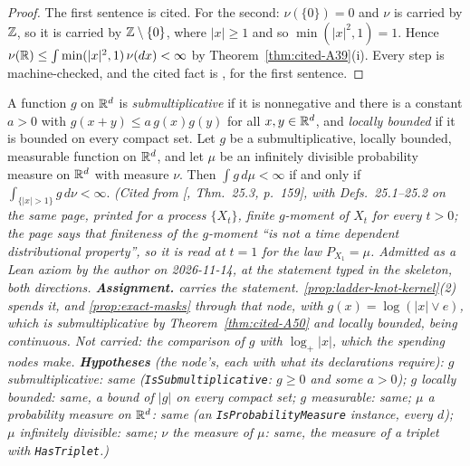 \begin{proof}
\leanok
{}
The first sentence is cited. For the second: $\nu(\{0\}) = 0$ and $\nu$ is carried by $\mathbb{Z}$, so it
is carried by $\mathbb{Z} \setminus \{0\}$, where $|x| \ge 1$ and so $\min(|x|^2, 1) = 1$. Hence
$\nu(\mathbb{R}) \le \int \min(|x|^2, 1)\,\nu(dx) < \infty$ by Theorem~\ref{thm:cited-A39}(i). Every step
is machine-checked, and the cited fact is , for the first sentence.
\end{proof}

\begin{theorem}
\label{thm:cited-A49}
\leanok
{}
A function $g$ on $\mathbb{R}^d$ is \emph{submultiplicative} if it is nonnegative and there is a constant
$a > 0$ with $g(x + y) \le a\,g(x)g(y)$ for all $x, y \in \mathbb{R}^d$, and \emph{locally bounded} if it is
bounded on every compact set. Let $g$ be a submultiplicative, locally bounded, measurable function on
$\mathbb{R}^d$, and let $\mu$ be an infinitely divisible probability measure on $\mathbb{R}^d$ with \Levy{} measure
$\nu$. Then $\int g\,d\mu < \infty$ if and only if $\int_{\{|x| > 1\}}g\,d\nu < \infty$.
\statusA\quad{}\quad\emph{(Cited from [, Thm.~25.3, p.~159], with
Defs.~25.1--25.2 on the same page, printed for a \Levy{} process $\{X_t\}$, finite $g$-moment of
$X_t$ for every $t > 0$; the page says that finiteness of the $g$-moment ``is not a time dependent
distributional property'', so it is read at $t = 1$ for the law $P_{X_1} = \mu$. Admitted as a
Lean axiom by the author on 2026-11-14, at the statement typed in the skeleton, both directions.
\textbf{Assignment.}  carries the
statement. \ref{prop:ladder-knot-kernel}(2) spends it, and \ref{prop:exact-masks} through that node, with
$g(x) = \log(|x| \vee e)$, which is submultiplicative by Theorem~\ref{thm:cited-A50} and locally bounded,
being continuous. Not carried: the comparison of $g$ with $\log_+|x|$, which the spending nodes
make.
\textbf{Hypotheses} (the node's, each with what its declarations require): $g$ submultiplicative:
same (\texttt{IsSubmultiplicative}: $g \ge 0$ and some $a > 0$); $g$ locally bounded: same, a bound
of $|g|$ on every compact set; $g$ measurable: same; $\mu$ a probability measure on $\mathbb{R}^d$: same
(an \texttt{IsProbabilityMeasure} instance, every $d$); $\mu$ infinitely divisible: same; $\nu$
the \Levy{} measure of $\mu$: same, the measure of a triplet with \texttt{HasTriplet}.)}
\end{theorem}

